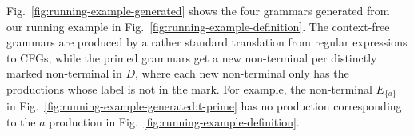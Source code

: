 \documentclass[runningheads]{llncs}
\begin{document}
\noindent Fig.~\ref{fig:running-example-generated} shows the four grammars generated from our running example in Fig.~\ref{fig:running-example-definition}. The context-free grammars are produced by a rather standard translation from regular expressions to CFGs, while the primed grammars get a new non-terminal per distinctly marked non-terminal in $D$, where each new non-terminal only has the productions whose label is not in the mark. For example, the non-terminal $E_{\{a\}}$ in Fig.~\ref{fig:running-example-generated:t-prime} has no production corresponding to the $a$ production in Fig.~\ref{fig:running-example-definition}.

\begin{figure}


\end{figure}
\end{document}
